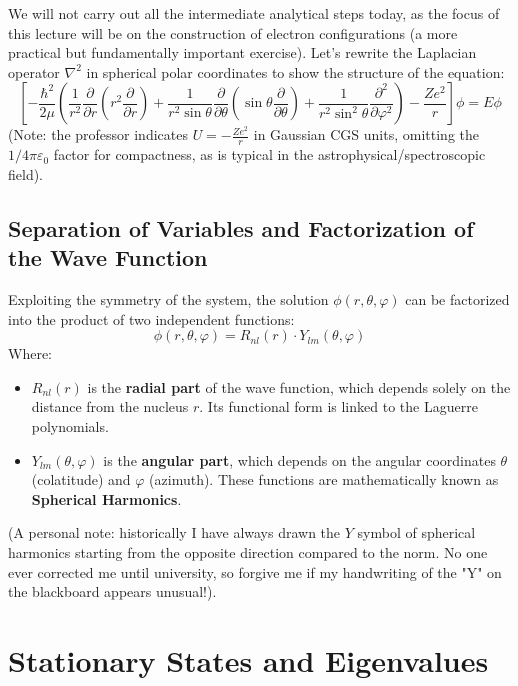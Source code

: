 We will not carry out all the intermediate analytical steps today, as the focus of this lecture will be on the construction of electron configurations (a more practical but fundamentally important exercise). Let's rewrite the Laplacian operator $\nabla^2$ in spherical polar coordinates to show the structure of the equation:
\begin{equation}
\left[ -\frac{\hbar^2}{2\mu} \left( \frac{1}{r^2} \frac{\partial}{\partial r} \left( r^2 \frac{\partial}{\partial r} \right) + \frac{1}{r^2 \sin\theta} \frac{\partial}{\partial \theta} \left( \sin\theta \frac{\partial}{\partial \theta} \right) + \frac{1}{r^2 \sin^2\theta} \frac{\partial^2}{\partial \varphi^2} \right) - \frac{Ze^2}{r} \right] \phi = E \phi
\end{equation}
(Note: the professor indicates $U = -\frac{Ze^2}{r}$ in Gaussian CGS units, omitting the $1/4\pi\varepsilon_0$ factor for compactness, as is typical in the astrophysical/spectroscopic field).

\subsection{Separation of Variables and Factorization of the Wave Function}

Exploiting the symmetry of the system, the solution $\phi(r, \theta, \varphi)$ can be factorized into the product of two independent functions:
\begin{equation}
\phi(r, \theta, \varphi) = R_{nl}(r) \cdot Y_{lm}(\theta, \varphi)
\end{equation}
Where:
\begin{itemize}
\item $R_{nl}(r)$ is the \textbf{radial part} of the wave function, which depends solely on the distance from the nucleus $r$. Its functional form is linked to the Laguerre polynomials.
\item $Y_{lm}(\theta, \varphi)$ is the \textbf{angular part}, which depends on the angular coordinates $\theta$ (colatitude) and $\varphi$ (azimuth). These functions are mathematically known as \textbf{Spherical Harmonics}.
\end{itemize}

(A personal note: historically I have always drawn the $Y$ symbol of spherical harmonics starting from the opposite direction compared to the norm. No one ever corrected me until university, so forgive me if my handwriting of the "Y" on the blackboard appears unusual!).

\section{Stationary States and Eigenvalues}

